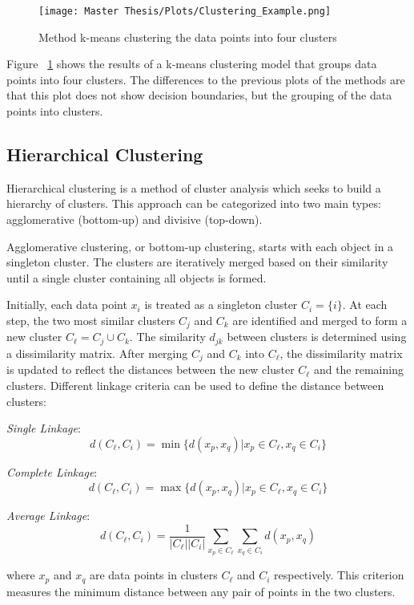 \FloatBarrier
\begin{figure}[h!]
    \centering
    \texttt{[image: Master Thesis/Plots/Clustering\_Example.png]}
    \caption{Method k-means clustering the data points into four clusters}
    \label{fig:clustering}
\end{figure}
\FloatBarrier

Figure ~\ref{fig:clustering} shows the results of a k-means clustering model that groups data points into four clusters. The differences to the previous plots of the methods are that this plot does not show decision boundaries, but the grouping of the data points into clusters.

\subsection{Hierarchical Clustering}

Hierarchical clustering is a method of cluster analysis which seeks to build a hierarchy of clusters. This approach can be categorized into two main types: agglomerative (bottom-up) and divisive (top-down).

Agglomerative clustering, or bottom-up clustering, starts with each object in a singleton cluster. The clusters are iteratively merged based on their similarity until a single cluster containing all objects is formed. 

Initially, each data point \( x_i \) is treated as a singleton cluster \( C_i = \{i\} \). At each step, the two most similar clusters \( C_j \) and \( C_k \) are identified and merged to form a new cluster \( C_\ell = C_j \cup C_k \). The similarity \( d_{jk} \) between clusters is determined using a dissimilarity matrix. After merging \( C_j \) and \( C_k \) into \( C_\ell \), the dissimilarity matrix is updated to reflect the distances between the new cluster \( C_\ell \) and the remaining clusters. Different linkage criteria can be used to define the distance between clusters: 

\textit{Single Linkage}: 
\[ d(C_\ell, C_i) = \min \{d(x_p, x_q) | x_p \in C_\ell, x_q \in C_i\} \]

\textit{Complete Linkage}: 
\[ d(C_\ell, C_i) = \max \{d(x_p, x_q) | x_p \in C_\ell, x_q \in C_i\} \]

\textit{Average Linkage}: 
\[ d(C_\ell, C_i) = \frac{1}{|C_\ell||C_i|} \sum_{x_p \in C_\ell} \sum_{x_q \in C_i} d(x_p, x_q) \]

where $x_p$ and $x_q$ are data points in clusters $C_\ell$ and $C_i$ respectively. This criterion measures the minimum distance between any pair of points in the two clusters.
 
